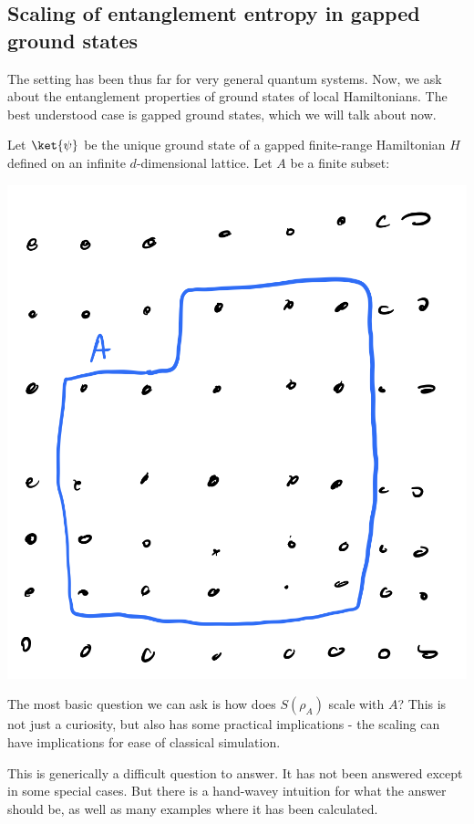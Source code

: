 \subsection{Scaling of entanglement entropy in gapped ground states}
The setting has been thus far for very general quantum systems. Now, we ask about the entanglement properties of ground states of local Hamiltonians. The best understood case is gapped ground states, which we will talk about now. 

Let $\ket{\psi}$ be the unique ground state of a gapped finite-range Hamiltonian $H$ defined on an infinite $d$-dimensional lattice. Let $A$ be a finite subset:

\begin{center}
    \includegraphics[scale=0.35]{Lectures/Images/lec16-Aregion.png}
\end{center}

The most basic question we can ask is how does $S(\rho_A)$ scale with $A$? This is not just a curiosity, but also has some practical implications - the scaling can have implications for ease of classical simulation.

This is generically a difficult question to answer. It has not been answered except in some special cases. But there is a hand-wavey intuition for what the answer should be, as well as many examples where it has been calculated.

